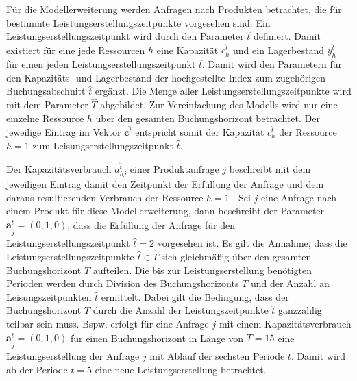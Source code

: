 Für die Modellerweiterung werden Anfragen nach Produkten betrachtet, die für bestimmte Leistungserstellungszeitpunkte vorgesehen sind. Ein Leistungserstellungszeitpunkt wird durch den Parameter $\hat{t}$ definiert. Damit existiert für eine jede Ressourcen $h$ eine Kapazität $c_h^{\hat t}$ und ein Lagerbestand $y_h^{\hat t}$ für einen jeden Leistungserstellungszeitpunkt $\hat{t}$. Damit wird den Parametern für den Kapazitäts- und Lagerbestand der hochgestellte Index zum zugehörigen Buchungsabschnitt $\hat{t}$ ergänzt. Die Menge aller Leistungserstellungszeitpunkte wird mit dem Parameter $\hat T$ abgebildet. Zur Vereinfachung des Modells wird nur eine einzelne Ressource $h$ über den gesamten Buchungshorizont betrachtet. Der jeweilige Eintrag im Vektor $\textbf{c}^{\hat t}$ entspricht somit der Kapazität $c_h^{\hat t}$ der Ressource $h=1$ zum Leisungserstellungszeitpunkt $\hat{t}$.

Der Kapazitätsverbrauch $a_{hj}^{\hat t}$ einer Produktanfrage $j$ beschreibt mit dem jeweiligen Eintrag damit den Zeitpunkt der Erfüllung der Anfrage und dem daraus resultierenden Verbrauch der Ressource $h=1$ . Sei $\tilde{j}$ eine Anfrage nach einem Produkt für diese Modellerweiterung, dann beschreibt der Parameter $\textbf{a}_{\tilde{j}}^{\hat t}=(0,1,0)$, dass die Erfüllung der Anfrage für den Leistungserstellungszeitpunkt $\hat{t}=2$ vorgesehen ist. Es gilt die Annahme, dass die Leistungserstellungszeitpunkte $\hat t\in \hat T$ sich gleichmäßig über den gesamten Buchungshorizont $T$ aufteilen. Die bis zur Leistungserstellung benötigten Perioden werden durch Division des Buchungshorizonts $T$ und der Anzahl an Leisungszeitpunkten $\hat t$ ermittelt. Dabei gilt die Bedingung, dass der Buchungshorizont $T$ durch die Anzahl der Leistungszeitpunkte $\hat t$ ganzzahlig teilbar sein muss. Bspw. erfolgt für eine Anfrage $\tilde j$ mit einem Kapazitätsverbrauch $\textbf{a}^{\hat t}_{\tilde{j}}=(0,1,0)$ für einen Buchungshorizont in Länge von $T=15$ eine Leistungserstellung der Anfrage $j$ mit Ablauf der sechsten Periode $t$. Damit wird ab der Periode $t=5$ eine neue Leistungserstellung betrachtet.

